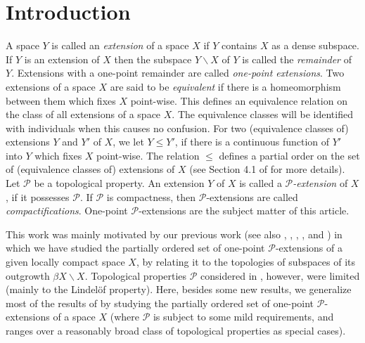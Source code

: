 \documentclass{amsart}
\theoremstyle{definition}
\theoremstyle{remark}
\theoremstyle{notation}
\numberwithin{equation}{section}
\begin{document}
\maketitle

\section{Introduction}

A space $Y$ is called an {\em extension} of a space $X$ if $Y$
contains $X$ as a dense subspace.  If $Y$ is an extension of  $X$ then the subspace $Y\backslash X$ of $Y$ is called the
{\em  remainder} of $Y$.  Extensions with a one-point remainder are called {\em one-point extensions}. Two extensions of a space $X$ are said to be {\em equivalent} if there is a homeomorphism between them
which fixes $X$ point-wise. This defines an equivalence relation on the class of all extensions of a space $X$. The equivalence classes
will be identified with individuals when this causes no confusion. For two (equivalence classes of)  extensions $Y$ and $Y'$ of $X$, we
let $Y\leq Y'$, if there is a continuous function of $Y'$ into $Y$ which fixes  $X$ point-wise. The relation $\leq$ defines  a partial
order on the set of (equivalence classes of) extensions of $X$ (see Section 4.1 of \cite{PW} for more details). Let ${\mathcal P}$ be a topological
property. An extension $Y$ of $X$ is called a {\em
${\mathcal P}$-extension} of $X$, if it possesses ${\mathcal P}$. If ${\mathcal P}$ is compactness, then
${\mathcal P}$-extensions are called  {\em compactifications}. One-point ${\mathcal P}$-extensions are the subject matter of this article.

This work was mainly  motivated by our previous work \cite{Ko2} (see also \cite{Be}, \cite{HJW}, \cite{Ko1}, \cite{Ko4}, \cite{MRW1} and \cite{MRW2}) in which we have studied the partially ordered set of one-point ${\mathcal P}$-extensions of a given locally compact space $X$, by relating it to the topologies of subspaces of its outgrowth $\beta X\backslash X$. Topological properties ${\mathcal P}$  considered in \cite{Ko2}, however, were limited  (mainly to the Lindel\"{o}f property). Here, besides some new results, we generalize most of the results of \cite{Ko2} by studying  the partially ordered set of one-point ${\mathcal P}$-extensions of a space $X$ (where ${\mathcal P}$ is subject to some mild requirements, and ranges over a reasonably  broad class of topological properties as special cases).
\end{document}
